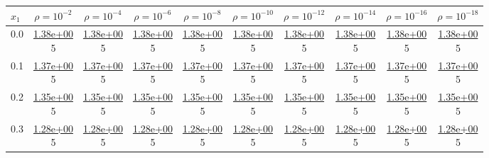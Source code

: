 \begin{table}[H]
\centering
\footnotesize
\begin{tabular}{|l||c|c|c|c|c|c|c|c|c|}
\toprule
$x_1$ & $\rho=10^{-2}$ & $\rho=10^{-4}$ & $\rho=10^{-6}$ & $\rho=10^{-8}$ & $\rho=10^{-10}$ & $\rho=10^{-12}$ & $\rho=10^{-14}$ & $\rho=10^{-16}$ & $\rho=10^{-18}$ \\
\midrule \midrule
0.0 & \makecell{\ul{1.38e+00} \\ 5} & \makecell{\ul{1.38e+00} \\ 5} & \makecell{\ul{1.38e+00} \\ 5} & \makecell{\ul{1.38e+00} \\ 5} & \makecell{\ul{1.38e+00} \\ 5} & \makecell{\ul{1.38e+00} \\ 5} & \makecell{\ul{1.38e+00} \\ 5} & \makecell{\ul{1.38e+00} \\ 5} & \makecell{\ul{1.38e+00} \\ 5} \\
\hline
 0.1 & \makecell{\ul{1.37e+00} \\ 5} & \makecell{\ul{1.37e+00} \\ 5} & \makecell{\ul{1.37e+00} \\ 5} & \makecell{\ul{1.37e+00} \\ 5} & \makecell{\ul{1.37e+00} \\ 5} & \makecell{\ul{1.37e+00} \\ 5} & \makecell{\ul{1.37e+00} \\ 5} & \makecell{\ul{1.37e+00} \\ 5} & \makecell{\ul{1.37e+00} \\ 5} \\
\hline
 0.2 & \makecell{\ul{1.35e+00} \\ 5} & \makecell{\ul{1.35e+00} \\ 5} & \makecell{\ul{1.35e+00} \\ 5} & \makecell{\ul{1.35e+00} \\ 5} & \makecell{\ul{1.35e+00} \\ 5} & \makecell{\ul{1.35e+00} \\ 5} & \makecell{\ul{1.35e+00} \\ 5} & \makecell{\ul{1.35e+00} \\ 5} & \makecell{\ul{1.35e+00} \\ 5} \\
\hline
 0.3 & \makecell{\ul{1.28e+00} \\ 5} & \makecell{\ul{1.28e+00} \\ 5} & \makecell{\ul{1.28e+00} \\ 5} & \makecell{\ul{1.28e+00} \\ 5} & \makecell{\ul{1.28e+00} \\ 5} & \makecell{\ul{1.28e+00} \\ 5} & \makecell{\ul{1.28e+00} \\ 5} & \makecell{\ul{1.28e+00} \\ 5} & \makecell{\ul{1.28e+00} \\ 5} \\

\end{tabular}
\end{table}
